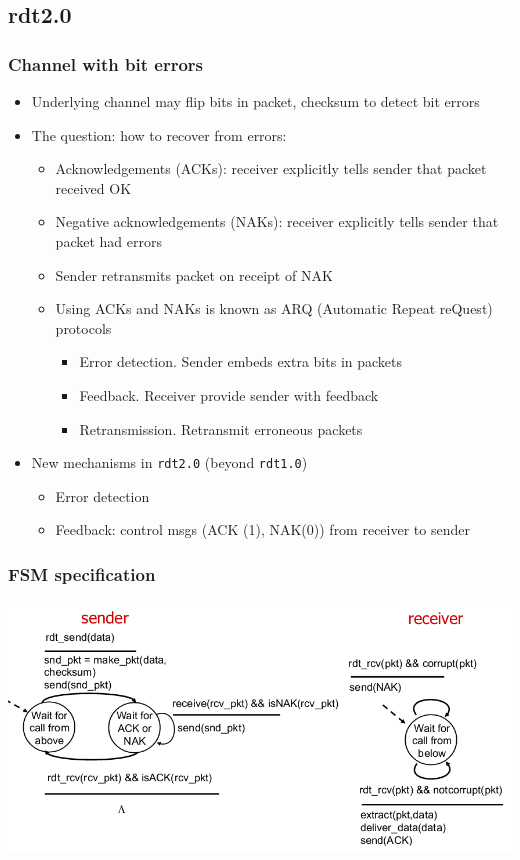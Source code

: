 \documentclass{article}[18pt]
\begin{document}
\subsection{rdt2.0}
\subsubsection{Channel with bit errors}
\begin{itemize}
	\item Underlying channel may flip bits in packet, checksum to detect bit errors
	\item The question: how to recover from errors:
	\begin{itemize}
		\item Acknowledgements (ACKs): receiver explicitly tells sender that packet received OK
		\item Negative acknowledgements (NAKs): receiver explicitly tells sender that packet had errors
		\item Sender retransmits packet on receipt of NAK
		\item Using ACKs and NAKs is known as ARQ (Automatic Repeat reQuest) protocols
		\begin{itemize}
			\item Error detection. Sender embeds extra bits in packets
			\item Feedback. Receiver provide sender with feedback
			\item Retransmission. Retransmit erroneous packets
		\end{itemize}
	\end{itemize}
	\item New mechanisms in \texttt{rdt2.0} (beyond \texttt{rdt1.0})
	\begin{itemize}
		\item Error detection
		\item Feedback: control msgs (ACK (1), NAK(0)) from receiver to sender
	\end{itemize}
\end{itemize}
\subsubsection{FSM specification}
\begin{center}
	\includegraphics[scale=0.7]{FSM}
\end{center}
\end{document}
